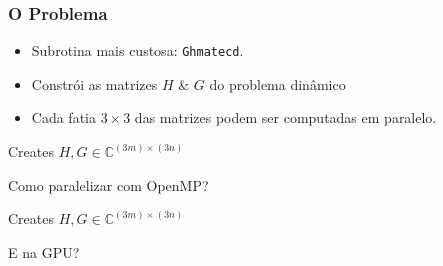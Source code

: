 \documentclass{beamer}
\newcommand{\Cfield}{\mathbb{C}}
\begin{document}

\begin{frame}
\frametitle{O Problema}
\begin{itemize}
\item Subrotina mais custosa: \texttt{Ghmatecd}.
\item Constrói as matrizes $H$ \& $G$ do problema dinâmico
\item Cada fatia $3 \times 3$ das matrizes podem ser computadas em paralelo.
\end{itemize}
\end{frame}


\begin{frame}
\begin{algorithm}[H]
\label{ghmatecd_old}
\caption{Creates $H, G \in \Cfield^{(3m)\times(3n)}$}
\begin{algorithmic}[1]
				\Else
				\EndIf
			\EndFor
	 \EndFor
	\EndProcedure
\end{algorithmic}
\end{algorithm}
Como paralelizar com OpenMP?
\end{frame}


\begin{frame}
\begin{algorithm}[H]
\label{ghmatecd_openmp}
\caption{Creates $H, G \in \Cfield^{(3m)\times(3n)}$}
\begin{algorithmic}[1]
				\Else
				\EndIf
			\EndFor
	 \EndFor
	\EndProcedure
\end{algorithmic}
\end{algorithm}
E na GPU?
\end{frame}
\end{document}
